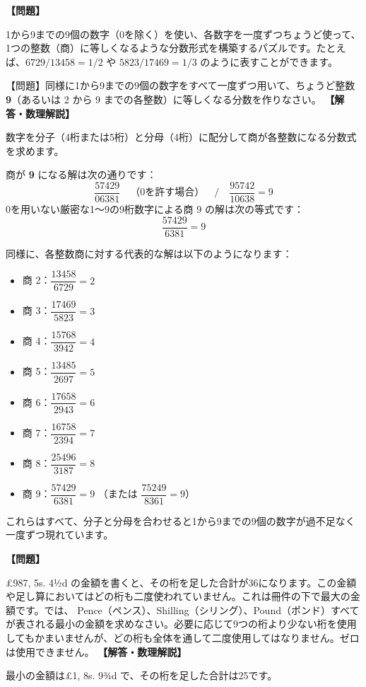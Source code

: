 \documentclass[10pt,a4paper,oneside,openany]{ltjsbook}
\begin{document}
\begin{tcolorbox}[colback=softblue,colframe=primaryblue,title=\textbf{第 88 問：数字分割算（パンデジタル分数） （原題: DIGITAL DIVISION.）},arc=2mm,boxrule=1pt,breakable]
\textbf{【問題】}\par\vspace{0.3em}
1から9までの9個の数字（0を除く）を使い、各数字を一度ずつちょうど使って、1つの整数（商）に等しくなるような分数形式を構築するパズルです。たとえば、$6729 / 13458 = 1/2$ や $5823 / 17469 = 1/3$ のように表すことができます。

【問題】同様に1から9までの9個の数字をすべて一度ずつ用いて、ちょうど整数 \textbf{9}（あるいは 2 から 9 までの各整数）に等しくなる分数を作りなさい。
\tcblower
\textbf{【解答・数理解説】}\par\vspace{0.3em}
数字を分子（4桁または5桁）と分母（4桁）に配分して商が各整数になる分数式を求めます。

商が \textbf{9} になる解は次の通りです：
\[ \frac{57429}{06381} \quad \text{（0を許す場合）} \quad / \quad \frac{95742}{10638} = 9 \]0を用いない厳密な1〜9の9桁数字による商 9 の解は次の等式です：
\[ \frac{57429}{6381} = 9 \]

同様に、各整数商に対する代表的な解は以下のようになります：
\begin{itemize}[leftmargin=2em]
\item 商 2：$\dfrac{13458}{6729} = 2$
\item 商 3：$\dfrac{17469}{5823} = 3$
\item 商 4：$\dfrac{15768}{3942} = 4$
\item 商 5：$\dfrac{13485}{2697} = 5$
\item 商 6：$\dfrac{17658}{2943} = 6$
\item 商 7：$\dfrac{16758}{2394} = 7$
\item 商 8：$\dfrac{25496}{3187} = 8$
\item 商 9：$\dfrac{57429}{6381} = 9$ （または $\dfrac{75249}{8361} = 9$）
\end{itemize}
これらはすべて、分子と分母を合わせると1から9までの9個の数字が過不足なく一度ずつ現れています。
\end{tcolorbox}

\begin{tcolorbox}[colback=softblue,colframe=primaryblue,title=\textbf{第 89 問：数字を足す （原題: ADDING THE DIGITS.）},arc=2mm,boxrule=1pt,breakable]
\textbf{【問題】}\par\vspace{0.3em}
£987, 5s. 4½d の金額を書くと、その桁を足した合計が36になります。この金額や足し算においてはどの桁も二度使われていません。これは冊件の下で最大の金額です。では、 Pence（ペンス）、Shilling（シリング）、Pound（ポンド）すべてが表される最小の金額を求めなさい。必要に応じて9つの桁より少ない桁を使用してもかまいませんが、どの桁も全体を通して二度使用してはなりません。ゼロは使用できません。
\tcblower
\textbf{【解答・数理解説】}\par\vspace{0.3em}
最小の金額は£1, 8s. 9¾d で、その桁を足した合計は25です。
\end{tcolorbox}
\end{document}
